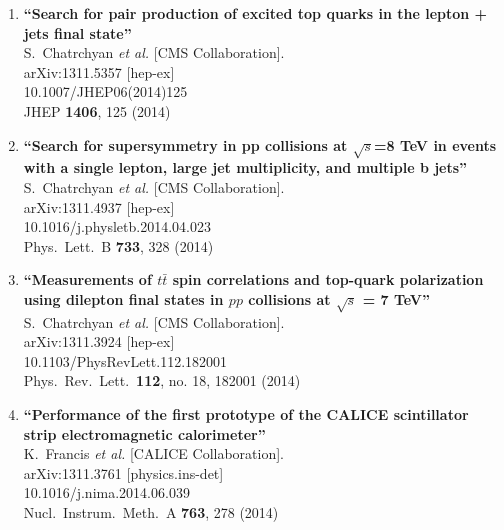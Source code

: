 \documentclass{article}
\begin{document}
\begin{enumerate}
\item%
{\bf ``Search for pair production of excited top quarks in the lepton + jets final state''}
  \\{}S.~Chatrchyan {\it et al.}  [CMS Collaboration].
  \\{}arXiv:1311.5357 [hep-ex]
    \\{}10.1007/JHEP06(2014)125
\\{}JHEP {\bf 1406}, 125 (2014) %


\item%
{\bf ``Search for supersymmetry in pp collisions at $\sqrt{s}$=8 TeV in events with a single lepton, large jet multiplicity, and multiple b jets''}
  \\{}S.~Chatrchyan {\it et al.}  [CMS Collaboration].
  \\{}arXiv:1311.4937 [hep-ex]
    \\{}10.1016/j.physletb.2014.04.023
\\{}Phys.\ Lett.\ B {\bf 733}, 328 (2014) %


\item%
{\bf ``Measurements of $t\bar{t}$ spin correlations and top-quark polarization using dilepton final states in $pp$ collisions at $\sqrt{s}$ = 7 TeV''}
  \\{}S.~Chatrchyan {\it et al.}  [CMS Collaboration].
  \\{}arXiv:1311.3924 [hep-ex]
    \\{}10.1103/PhysRevLett.112.182001
\\{}Phys.\ Rev.\ Lett.\  {\bf 112}, no. 18, 182001 (2014) %


\item%
{\bf ``Performance of the first prototype of the CALICE scintillator strip electromagnetic calorimeter''}
  \\{}K.~Francis {\it et al.}  [CALICE Collaboration].
  \\{}arXiv:1311.3761 [physics.ins-det]
    \\{}10.1016/j.nima.2014.06.039
\\{}Nucl.\ Instrum.\ Meth.\ A {\bf 763}, 278 (2014) %



\end{enumerate}
\end{document}
